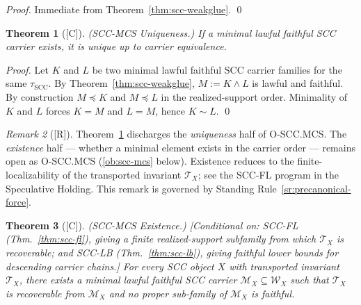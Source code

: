 \documentclass[12pt,oneside]{amsbook}
\theoremstyle{plain}
\newtheorem{theorem}{Theorem}[section]
\theoremstyle{definition}
\theoremstyle{remark}
\newtheorem{remark}[theorem]{Remark}
\newcommand{\status}[1]{\textup{[#1]}}
\begin{document}
\begin{proof}
Immediate from Theorem~\ref{thm:scc-weakglue}.
\qed
\end{proof}

\begin{theorem}[\status{C}]\label{thm:scc-mcs-uniqueness}
\textup{(SCC-MCS Uniqueness.)}
If a minimal lawful faithful SCC carrier exists, it is unique up to
carrier equivalence.
\end{theorem}

\begin{proof}
Let $K$ and $L$ be two minimal lawful faithful SCC carrier families
for the same $\tau_{\mathrm{SCC}}$. By
Theorem~\ref{thm:scc-weakglue}, $M := K \wedge L$ is lawful and
faithful. By construction $M \preceq K$ and $M \preceq L$ in the
realized-support order. Minimality of $K$ and $L$ forces $K = M$
and $L = M$, hence $K \sim L$.
\qed
\end{proof}

\begin{remark}[\status{R}]
Theorem~\ref{thm:scc-mcs-uniqueness} discharges the \emph{uniqueness}
half of O-SCC.MCS. The \emph{existence} half --- whether a minimal
element exists in the carrier order --- remains open as
O-SCC.MCS (\ref{ob:scc-mcs} below). Existence reduces to the
finite-localizability of the transported invariant $\mathcal{T}_X$;
see the SCC-FL program in the Speculative Holding. This remark is
governed by Standing Rule~\ref{sr:precanonical-force}.
\end{remark}


\begin{theorem}[\status{C}]\label{thm:scc-mcs-existence}
\textup{(SCC-MCS Existence.)}
\textup{[Conditional on: SCC-FL (Thm.~\ref{thm:scc-fl}), giving a
finite realized-support subfamily from which $\mathcal{T}_X$ is
recoverable; and SCC-LB (Thm.~\ref{thm:scc-lb}), giving faithful
lower bounds for descending carrier chains.]}
For every SCC object $X$ with transported invariant $\mathcal{T}_X$,
there exists a minimal lawful faithful SCC carrier
$\mathcal{M}_X \subseteq \mathcal{W}_X$
such that $\mathcal{T}_X$ is recoverable from $\mathcal{M}_X$ and
no proper sub-family of $\mathcal{M}_X$ is faithful.
\end{theorem}
\end{document}
